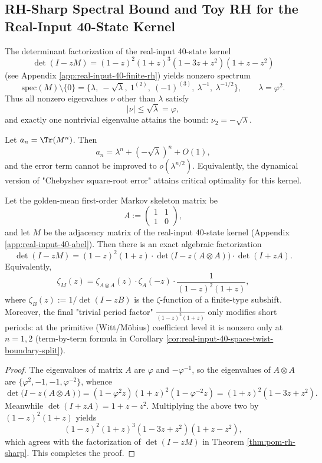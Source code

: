 \subsection{RH-Sharp Spectral Bound and Toy RH for the Real-Input 40-State Kernel}\label{subsec:pom-rh-sharp}
\begin{theorem}\label{thm:pom-rh-sharp}
The determinant factorization of the real-input 40-state kernel
\[
\det(I-zM)=(1-z)^2(1+z)^3(1-3z+z^2)(1+z-z^2)
\]
(see Appendix \ref{app:real-input-40-finite-rh}) yields nonzero spectrum
\[
\mathrm{spec}(M)\setminus\{0\}
=\{\lambda,\ -\sqrt{\lambda},\ 1^{(2)},\ (-1)^{(3)},\ \lambda^{-1},\ \lambda^{-1/2}\},
\qquad \lambda=\varphi^2.
\]
Thus all nonzero eigenvalues $\nu$ other than $\lambda$ satisfy
\[
|\nu|\le \sqrt{\lambda}=\varphi,
\]
and exactly one nontrivial eigenvalue attains the bound: $\nu_2=-\sqrt{\lambda}$.
\end{theorem}

\begin{corollary}\label{cor:pom-rh-sharp-an}
Let $a_n=\Tr(M^n)$. Then
\[
a_n=\lambda^n+(-\sqrt{\lambda})^n+O(1),
\]
and the error term cannot be improved to $o(\lambda^{n/2})$. Equivalently, the dynamical version of "Chebyshev square-root error" attains critical optimality for this kernel.
\end{corollary}

\begin{proposition}\label{prop:pom-zeta-factorization-40}
Let the golden-mean first-order Markov skeleton matrix be
$$
A:=
\begin{pmatrix}
1&1\\
1&0
\end{pmatrix},
$$
and let \(M\) be the adjacency matrix of the real-input 40-state kernel (Appendix \ref{app:real-input-40-abel}).
Then there is an exact algebraic factorization
$$
\det(I-zM)
=(1-z)^2(1+z)\cdot \det\!\bigl(I-z(A\otimes A)\bigr)\cdot \det(I+zA).
$$
Equivalently,
$$
\zeta_M(z)
=\zeta_{A\otimes A}(z)\cdot \zeta_A(-z)\cdot \frac{1}{(1-z)^2(1+z)},
$$
where \(\zeta_B(z):=1/\det(I-zB)\) is the \(\zeta\)-function of a finite-type subshift.
Moreover, the final "trivial period factor" \(\frac{1}{(1-z)^2(1+z)}\) only modifies short periods: at the primitive (Witt/Möbius) coefficient level it is nonzero only at \(n=1,2\) (term-by-term formula in Corollary \ref{cor:real-input-40-space-twist-boundary-split}).
\end{proposition}
\begin{proof}
The eigenvalues of matrix \(A\) are \(\varphi\) and \(-\varphi^{-1}\), so the eigenvalues of \(A\otimes A\) are
\(\{\varphi^2,-1,-1,\varphi^{-2}\}\), whence
$$
\det\!\bigl(I-z(A\otimes A)\bigr)=(1-\varphi^2 z)(1+z)^2(1-\varphi^{-2}z)=(1+z)^2(1-3z+z^2).
$$
Meanwhile
\(
\det(I+zA)=1+z-z^2
\).
Multiplying the above two by \((1-z)^2(1+z)\) yields
$$
(1-z)^2(1+z)^3(1-3z+z^2)(1+z-z^2),
$$
which agrees with the factorization of \(\det(I-zM)\) in Theorem \ref{thm:pom-rh-sharp}. This completes the proof.
\end{proof}


